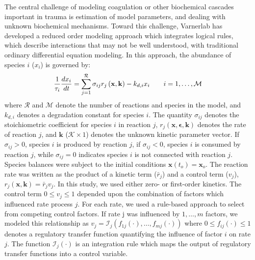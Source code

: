 \documentclass[11pt]{article}
\begin{document}
The central challenge of modeling coagulation or other biochemical cascades important in trauma is estimation of model parameters, and dealing with unknown biochemical mechanisms.
Toward this challenge, Varnerlab has developed a reduced order modeling approach which integrates logical rules, which describe interactions that may not be
well understood, with traditional ordinary differential equation modeling.
In this approach, the abundance of species $i$ ($x_{i}$) is governed by:
\begin{equation}
	\frac{1}{\tau_{i}}\frac{dx_{i}}{dt}  =  \sum_{j = 1}^{\mathcal{R}}\sigma_{ij}r_{j}\left(\mathbf{x},\mathbf{k}\right) - k_{d,i}x_{i}\qquad{i=1,\hdots,\mathcal{M}}\\
\end{equation}
where $\mathcal{R}$ and $\mathcal{M}$ denote the number of reactions and species in the model, and $k_{d,i}$ denotes a degradation constant for species $i$.
The quantity $\sigma_{ij}$ denotes the stoichiometric coefficient for species $i$ in reaction $j$,
$r_{j}\left(\mathbf{x},\mathbf{\epsilon},\mathbf{k}\right)$ denotes the rate of reaction $j$, and $\mathbf{k}$ ($\mathcal{K}\times{1}$) denotes the unknown kinetic parameter vector.
If $\sigma_{ij}>0$, species $i$ is produced by reaction $j$, if $\sigma_{ij}<0$, species $i$ is consumed by reaction $j$,
while $\sigma_{ij} = 0$ indicates species $i$ is not connected with reaction $j$.
Species balances were subject to the initial conditions $\mathbf{x}\left(t_{o}\right) = \mathbf{x}_{o}$.
The reaction rate was written as the product of a kinetic term ($\bar{r}_{j}$) and a control term ($v_{j}$), $r_{j}\left(\mathbf{x},\mathbf{k}\right) = \bar{r}_{j}v_{j}$.
In this study, we used either zero- or first-order kinetics.
The control term $0\leq v_{j}\leq 1$ depended upon the combination of factors which influenced rate process $j$.
For each rate, we used a rule-based approach to select from competing control factors.
If rate j was influenced by $1,\dots,m$ factors, we modeled this relationship as
$v_{j} = \mathcal{I}_{j}\left(f_{1j}\left(\cdot\right),\hdots,f_{mj}\left(\cdot\right)\right)$
where $0\leq f_{ij}\left(\cdot\right)\leq 1$ denotes a regulatory transfer function quantifying the influence of factor $i$ on rate $j$.
The function $\mathcal{I}_{j}\left(\cdot\right)$ is an integration rule which maps the output of regulatory transfer functions into a control
variable.
\end{document}

